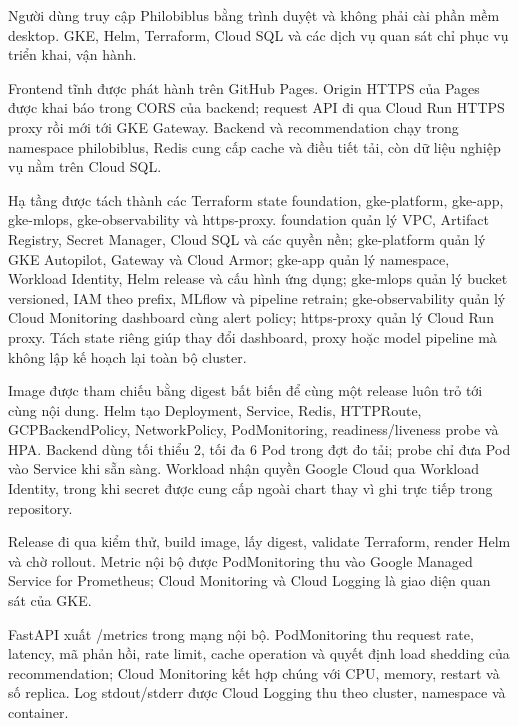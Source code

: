 \clearpage
{}
Người dùng truy cập Philobiblus bằng trình duyệt và không phải cài phần mềm desktop. GKE, Helm, Terraform, Cloud SQL và các dịch vụ quan sát chỉ phục vụ triển khai, vận hành.

Frontend tĩnh được phát hành trên GitHub Pages. Origin HTTPS của Pages được khai báo trong CORS của backend; request API đi qua Cloud Run HTTPS proxy rồi mới tới GKE Gateway. Backend và recommendation chạy trong namespace philobiblus, Redis cung cấp cache và điều tiết tải, còn dữ liệu nghiệp vụ nằm trên Cloud SQL.

Hạ tầng được tách thành các Terraform state foundation, gke-platform, gke-app, gke-mlops, gke-observability và https-proxy. foundation quản lý VPC, Artifact Registry, Secret Manager, Cloud SQL và các quyền nền; gke-platform quản lý GKE Autopilot, Gateway và Cloud Armor; gke-app quản lý namespace, Workload Identity, Helm release và cấu hình ứng dụng; gke-mlops quản lý bucket versioned, IAM theo prefix, MLflow và pipeline retrain; gke-observability quản lý Cloud Monitoring dashboard cùng alert policy; https-proxy quản lý Cloud Run proxy. Tách state riêng giúp thay đổi dashboard, proxy hoặc model pipeline mà không lập kế hoạch lại toàn bộ cluster.

Image được tham chiếu bằng digest bất biến để cùng một release luôn trỏ tới cùng nội dung. Helm tạo Deployment, Service, Redis, HTTPRoute, GCPBackendPolicy, NetworkPolicy, \mbox{PodMonitoring}, readiness/liveness probe và HPA. Backend dùng tối thiểu 2, tối đa 6 Pod trong đợt đo tải; probe chỉ đưa Pod vào Service khi sẵn sàng. Workload nhận quyền Google Cloud qua Workload Identity, trong khi secret được cung cấp ngoài chart thay vì ghi trực tiếp trong repository.

Release đi qua kiểm thử, build image, lấy digest, validate Terraform, render Helm và chờ rollout. Metric nội bộ được PodMonitoring thu vào Google Managed Service for Prometheus; Cloud Monitoring và Cloud Logging là giao diện quan sát của GKE.

FastAPI xuất /metrics trong mạng nội bộ. PodMonitoring thu request rate, latency, mã phản hồi, rate limit, cache operation và quyết định load shedding của recommendation; Cloud Monitoring kết hợp chúng với CPU, memory, restart và số replica. Log stdout/stderr được Cloud Logging thu theo cluster, namespace và container.

